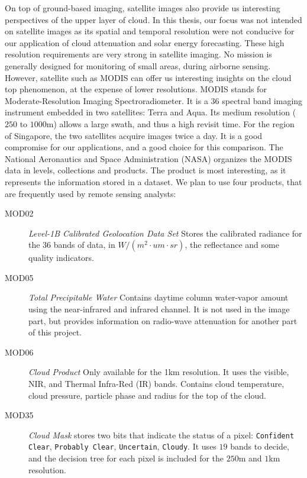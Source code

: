 On top of ground-based imaging, satellite images also provide us interesting perspectives of the upper layer of cloud. In this thesis, our focus was not intended on satellite images as its spatial and temporal resolution were not conducive for our application of cloud attenuation and solar energy forecasting. These high resolution requirements are very strong in satellite imaging. No mission is generally designed for monitoring of small areas, during airborne sensing. However, satellite such as MODIS can offer us interesting insights on the cloud top phenomenon, at the expense of lower resolutions. MODIS stands for Moderate-Resolution Imaging Spectroradiometer. It is a 36 spectral band imaging instrument embedded in two satellites: Terra and Aqua. Its medium resolution ($250$ to $1000$m) allows a large swath, and thus a high revisit time. For the region of Singapore, the two satellites acquire images twice a day. It is a good compromise for our applications, and a good choice for this comparison. The National Aeronautics and Space Administration (NASA) organizes the MODIS data in levels, collections and products. The product is most interesting, as it represents the information stored in a dataset. We plan to use four products, that are frequently used by remote sensing analysts:

\begin{description} 
\item[MOD02] \emph{Level-1B Calibrated Geolocation Data Set} Stores the calibrated radiance for the $36$ bands of data, in $W/(m^{2}\cdot um \cdot sr)$, the reflectance and some quality indicators.
\item[MOD05] \emph{Total Precipitable Water} Contains daytime column water-vapor amount using the near-infrared and infrared channel. It is not used in the image part, but provides information on radio-wave attenuation for another part of this project.
\item[MOD06] \emph{Cloud Product} Only available for the 1km resolution. It uses the visible, NIR, and Thermal Infra-Red (IR) bands. Contains cloud temperature, cloud pressure, particle phase and radius for the top of the cloud.
\item[MOD35] \emph{Cloud Mask} stores two bits that indicate the status of a pixel: \texttt{Confident} \texttt{Clear}, \texttt{Probably Clear}, \texttt{Uncertain}, \texttt{Cloudy}. It uses $19$ bands to decide, and the decision tree for each pixel is included for the $250$m and $1$km resolution.
\end{description}

